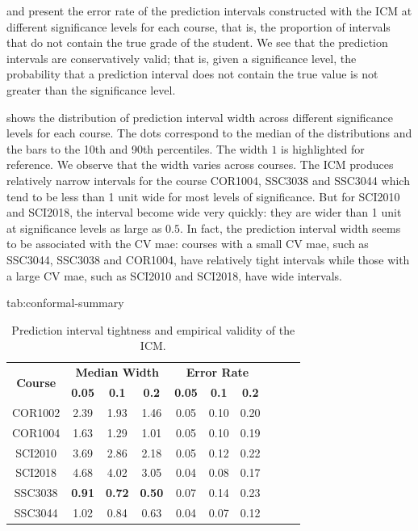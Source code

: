 \documentclass[pmlr]{jmlr}%
\begin{document}
 and  present the error rate of the prediction intervals constructed with the ICM at different significance levels for each course, that is, the proportion of intervals that do not contain the true grade of the student. We see that the prediction intervals are conservatively valid; that is, given a significance level, the probability that a prediction interval does not contain the true value is not greater than the significance level.

 shows the distribution of prediction interval width across different significance levels for each course. The dots correspond to the median of the distributions and the bars to the 10th and 90th percentiles. The width $1$ is highlighted for reference. We observe that the width varies across courses. The ICM produces relatively narrow intervals for the course COR1004, SSC3038 and SSC3044 which tend to be less than 1 unit wide for most levels of significance. But for SCI2010 and SCI2018, the interval become wide very quickly: they are wider than 1 unit at significance levels as large as $0.5$. In fact, the prediction interval width seems to be associated with the CV mae: courses with a small CV mae, such as SSC3044, SSC3038 and COR1004, have relatively tight intervals while those with a large CV mae, such as SCI2010 and SCI2018, have wide intervals.

\begin{table}[hbtp]
	\floatconts
	{tab:conformal-summary}
	{\caption{Prediction interval tightness and empirical validity of the ICM.}}	
	{\begin{tabular}{cccccccccc}
			\toprule
			\multirow{2}{*}{\bfseries Course} & \multicolumn{3}{c}{\bfseries Median Width} & \multicolumn{3}{c}{\bfseries Error Rate}\\
			& \bfseries 0.05 & \bfseries 0.1 & \bfseries 0.2 & \bfseries 0.05 & \bfseries 0.1 & \bfseries 0.2\\
			\midrule
			COR1002 & 2.39 & 1.93 & 1.46 & 0.05 & 0.10 & 0.20\\
			COR1004 & 1.63 & 1.29 & 1.01 & 0.05 & 0.10 & 0.19\\
			SCI2010 & 3.69 & 2.86 & 2.18 & 0.05 & 0.12 & 0.22\\
			SCI2018 & 4.68 & 4.02 & 3.05 & 0.04 & 0.08 & 0.17\\
			SSC3038 & \bfseries 0.91 & \bfseries 0.72 & \bfseries 0.50 & 0.07 & 0.14 & 0.23\\
			SSC3044 & 1.02 & 0.84 & 0.63 & 0.04 & 0.07 & 0.12\\
			\bottomrule
	\end{tabular}}	
\end{table}
\end{document}

